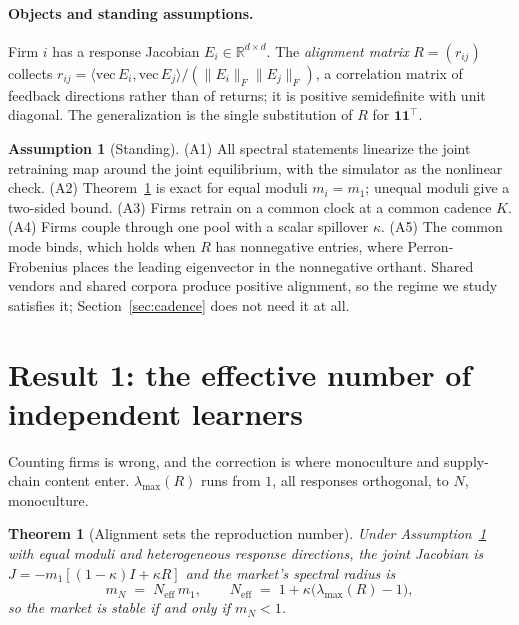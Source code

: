 \documentclass{article}
\theoremstyle{plain}
\newtheorem{theorem}{Theorem}
\theoremstyle{definition}
\newtheorem{assumption}{Assumption}
\newcommand{\Neff}{N_{\mathrm{eff}}}
\newcommand{\mN}{m_N}
\newcommand{\lmax}{\lambda_{\max}}
\begin{document}
\paragraph{Objects and standing assumptions.}
Firm $i$ has a response Jacobian $E_i \in \mathbb{R}^{d\times d}$. The \emph{alignment matrix} $R = (r_{ij})$ collects $r_{ij} = \langle \mathrm{vec}\,E_i, \mathrm{vec}\,E_j\rangle / (\|E_i\|_F \|E_j\|_F)$, a correlation matrix of feedback directions rather than of returns; it is positive semidefinite with unit diagonal. The generalization is the single substitution of $R$ for $\mathbf{1}\mathbf{1}^{\top}$.

\begin{assumption}[Standing]
\label{ass:standing}
(A1) All spectral statements linearize the joint retraining map around the joint equilibrium, with the simulator as the nonlinear check. (A2) Theorem~\ref{thm:alignment} is exact for equal moduli $m_i = m_1$; unequal moduli give a two-sided bound. (A3) Firms retrain on a common clock at a common cadence $K$. (A4) Firms couple through one pool with a scalar spillover $\kappa$. (A5) The common mode binds, which holds when $R$ has nonnegative entries, where Perron-Frobenius places the leading eigenvector in the nonnegative orthant. Shared vendors and shared corpora produce positive alignment, so the regime we study satisfies it; Section~\ref{sec:cadence} does not need it at all.
\end{assumption}

\section{Result 1: the effective number of independent learners}
\label{sec:alignment}

Counting firms is wrong, and the correction is where monoculture and supply-chain content enter. $\lmax(R)$ runs from $1$, all responses orthogonal, to $N$, monoculture.

\begin{theorem}[Alignment sets the reproduction number]
\label{thm:alignment}
Under Assumption~\ref{ass:standing} with equal moduli and heterogeneous response directions, the joint Jacobian is $J = -m_1[(1-\kappa)I + \kappa R]$ and the market's spectral radius is
\begin{equation}
\mN \;=\; \Neff\, m_1, \qquad \Neff \;=\; 1 + \kappa\bigl(\lmax(R) - 1\bigr),
\end{equation}
so the market is stable if and only if $\mN < 1$.
\end{theorem}
\end{document}
